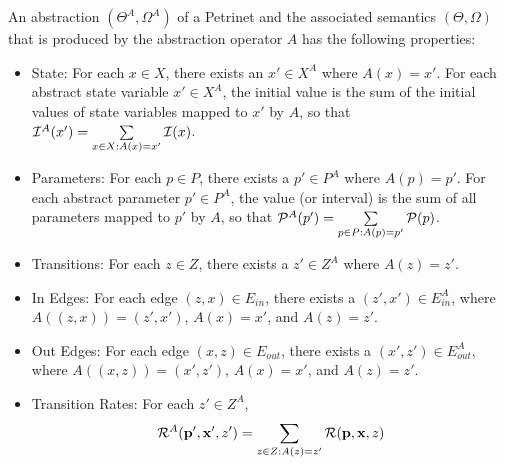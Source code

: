 \begin{definition}
    An abstraction $(\Theta^{A}, \Omega^{A})$ of a Petrinet and the associated
    semantics $(\Theta, \Omega)$ that is produced by the abstraction operator
    $A$ has the following properties:
    \begin{itemize}
        \item State: For each $x \in X$,  there exists an $x' \in
        X^{A}$ where $A(x) = x'$.  
         For each abstract state variable $x' \in X^{A}$, the initial value is the sum of the initial values of state variables mapped to $x'$ by $A$, so that  ${\cal I}^{A}(x') = \sum\limits_{x \in X: A(x) = x'} {\cal I}(x)$.
        \item Parameters: For each $p \in P$, there exists a $p'\in P^{A}$ where $A(p) = p'$.
        For each abstract parameter $p' \in P^{A}$, the value (or interval) is the sum of all parameters mapped to $p'$ by $A$, so that ${\cal P}^{A}(p') = \sum\limits_{p \in P: A(p) = p'} {\cal P}(p)$.
        \item Transitions: For each $z \in Z$, there exists a $z' \in Z^{A}$ where $A(z) = z'$.
        \item In Edges: For each edge $(z, x) \in E_{in}$, there exists a $(z',
        x')\in E_{in}^{A}$, where $A((z, x)) =
        (z', x')$, $A(x) = x'$, and $A(z) = z'$.
        \item Out Edges: For each edge $(x, z) \in E_{out}$, there exists a $(x',
        z')\in E_{out}^{A}$, where $A((x, z))
        = (x', z')$, $A(x) = x'$, and $A(z) = z'$.

        
        \item Transition Rates: For each $z' \in Z^{A}$, 
        \begin{equation}\label{eqn:agg-flow}
            {\cal R}^{A}({\bf p}', {\bf
        x}', z') = \sum\limits_{z \in Z: A(z)=z'} {\cal R}({\bf p}, {\bf
        x}, z)
    \end{equation}
    \end{itemize}
\end{definition}

